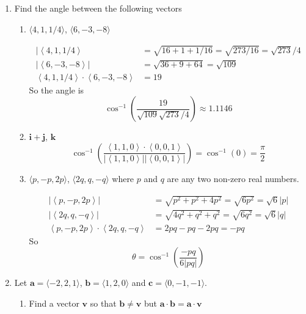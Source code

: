 \documentclass[12pt]{exam}
\newcommand{\gen}[1]{\left\langle #1 \right\rangle}
\newcommand{\ba}{\bm{a}}
\newcommand{\bb}{\bm{b}}
\newcommand{\bc}{\bm{c}}
\begin{document}
\begin{enumerate}
  \item Find the angle between the following vectors
    \begin{enumerate}
        \item \(\langle 4,1,1/4 \rangle\), \(\langle 6,-3,-8 \rangle\)

        \begin{solution}
          \begin{align*}
            |\gen{4,1,1/4} & =\sqrt{16+1+1/16}=\sqrt{273/16}=\sqrt{273}/4\\
            |\gen{6,-3,-8}| & =\sqrt{36+9+64}=\sqrt{109}\\
            \gen{4,1,1/4}\cdot\gen{6,-3,-8} & = 19
          \end{align*}
          So the angle is 
          \[
            \cos^{-1}\left(\dfrac{19}{\sqrt{109}\sqrt{273}/4}\right) \approx 1.1146
          \]
        \end{solution}

        \item \(\bm{i}+\bm{j}\), \(\bm{k}\)
          \[
            \cos^{-1}\left(\dfrac{\gen{1,1,0}\cdot\gen{0,0,1}}{|\gen{1,1,0}||\gen{0,0,1}|}\right)=\cos^{-1}(0)=\frac{\pi}{2}
          \]

        \item \(\langle p,-p,2p \rangle\), \(\langle 2q,q,-q\rangle\) where \(p\) and \(q\) are any two non-zero real numbers.

          \begin{solution}
            \begin{align*}
              |\gen{p,-p,2p}| & = \sqrt{p^2+p^2+4p^2}=\sqrt{6p^2} = \sqrt{6}|p|\\
              |\gen{2q,q,-q}| & = \sqrt{4q^2+q^2+q^2}=\sqrt{6q^2}=\sqrt{6}|q|\\
              \gen{p,-p,2p}\cdot\gen{2q,q,-q} & = 2pq-pq-2pq=-pq
            \end{align*}
            So
            \[\theta = \cos^{-1}\left(\frac{-pq}{6|pq|}\right)\]
          \end{solution}

    \end{enumerate}

  \item Let \(\bm{a}=\langle -2,2,1\rangle\), \(\bb=\langle 1,2,0\rangle\) and \(\bc=\langle 0,-1,-1\rangle\). 
    \begin{enumerate}
        \item Find a vector \(\bm{v}\) so that \(\bb\neq \bm{v}\) but \(\ba\cdot \bb=\ba\cdot\bm{v}\)


\end{enumerate}
\end{enumerate}
\end{document}
